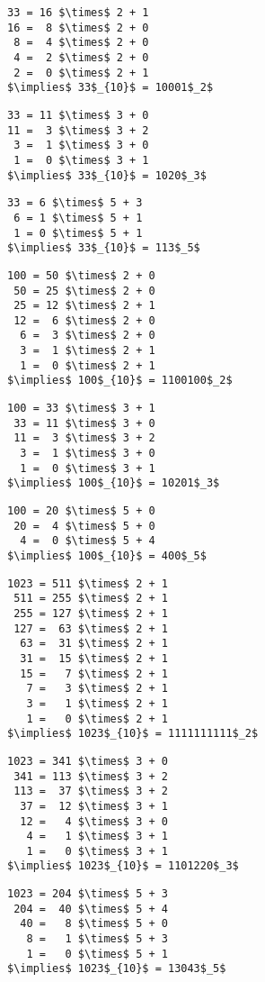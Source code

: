 \begin{multicols}{3}

\begin{lstlisting}
33 = 16 $\times$ 2 + 1
16 =  8 $\times$ 2 + 0
 8 =  4 $\times$ 2 + 0
 4 =  2 $\times$ 2 + 0
 2 =  0 $\times$ 2 + 1
$\implies$ 33$_{10}$ = 10001$_2$
\end{lstlisting}

\begin{lstlisting}
33 = 11 $\times$ 3 + 0
11 =  3 $\times$ 3 + 2
 3 =  1 $\times$ 3 + 0
 1 =  0 $\times$ 3 + 1
$\implies$ 33$_{10}$ = 1020$_3$
\end{lstlisting}

\begin{lstlisting}
33 = 6 $\times$ 5 + 3
 6 = 1 $\times$ 5 + 1
 1 = 0 $\times$ 5 + 1
$\implies$ 33$_{10}$ = 113$_5$
\end{lstlisting}

\vspace*{\fill}
\columnbreak

\begin{lstlisting}
100 = 50 $\times$ 2 + 0
 50 = 25 $\times$ 2 + 0
 25 = 12 $\times$ 2 + 1
 12 =  6 $\times$ 2 + 0
  6 =  3 $\times$ 2 + 0
  3 =  1 $\times$ 2 + 1
  1 =  0 $\times$ 2 + 1
$\implies$ 100$_{10}$ = 1100100$_2$
\end{lstlisting}

\begin{lstlisting}
100 = 33 $\times$ 3 + 1
 33 = 11 $\times$ 3 + 0
 11 =  3 $\times$ 3 + 2
  3 =  1 $\times$ 3 + 0
  1 =  0 $\times$ 3 + 1
$\implies$ 100$_{10}$ = 10201$_3$
\end{lstlisting}

\begin{lstlisting}
100 = 20 $\times$ 5 + 0
 20 =  4 $\times$ 5 + 0
  4 =  0 $\times$ 5 + 4
$\implies$ 100$_{10}$ = 400$_5$
\end{lstlisting}

\vspace*{\fill}
\columnbreak

\begin{lstlisting}
1023 = 511 $\times$ 2 + 1
 511 = 255 $\times$ 2 + 1
 255 = 127 $\times$ 2 + 1
 127 =  63 $\times$ 2 + 1
  63 =  31 $\times$ 2 + 1
  31 =  15 $\times$ 2 + 1
  15 =   7 $\times$ 2 + 1
   7 =   3 $\times$ 2 + 1
   3 =   1 $\times$ 2 + 1
   1 =   0 $\times$ 2 + 1
$\implies$ 1023$_{10}$ = 1111111111$_2$
\end{lstlisting}

\begin{lstlisting}
1023 = 341 $\times$ 3 + 0
 341 = 113 $\times$ 3 + 2
 113 =  37 $\times$ 3 + 2
  37 =  12 $\times$ 3 + 1
  12 =   4 $\times$ 3 + 0
   4 =   1 $\times$ 3 + 1
   1 =   0 $\times$ 3 + 1
$\implies$ 1023$_{10}$ = 1101220$_3$
\end{lstlisting}

\begin{lstlisting}
1023 = 204 $\times$ 5 + 3
 204 =  40 $\times$ 5 + 4
  40 =   8 $\times$ 5 + 0
   8 =   1 $\times$ 5 + 3
   1 =   0 $\times$ 5 + 1
$\implies$ 1023$_{10}$ = 13043$_5$
\end{lstlisting}

\end{multicols}

